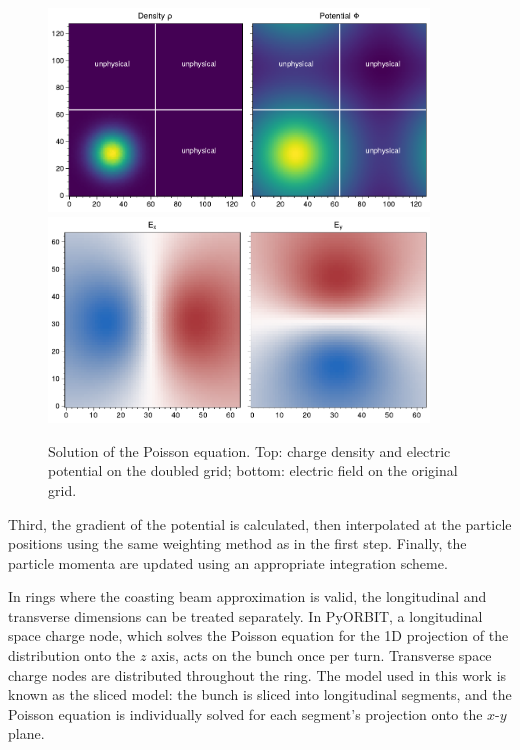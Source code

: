 \begin{figure}[!p]
    \centering
    \includegraphics[width=0.9\textwidth]{Images/chapter3/poisson.pdf}
    \vfill
    \vspace*{0.5cm}
    \vfill
    \includegraphics[width=0.9\textwidth]{Images/chapter3/Efield.pdf}
    \caption{Solution of the Poisson equation. Top: charge density and electric potential on the doubled grid; bottom: electric field on the original grid.}
    \label{fig:poisson}
\end{figure}
%
Third, the gradient of the potential is calculated, then interpolated at the particle positions using the same weighting method as in the first step. Finally, the particle momenta are updated using an appropriate integration scheme.

In rings where the coasting beam approximation is valid, the longitudinal and transverse dimensions can be treated separately. In PyORBIT, a longitudinal space charge node, which solves the Poisson equation for the 1D projection of the distribution onto the $z$ axis, acts on the bunch once per turn. Transverse space charge nodes are distributed throughout the ring. The model used in this work is known as the sliced model: the bunch is sliced into longitudinal segments, and the Poisson equation is individually solved for each segment's projection onto the $x$-$y$ plane.


